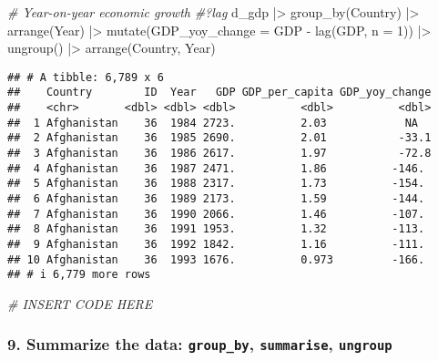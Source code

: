 \documentclass[
]{article}
\newenvironment{Shaded}{\begin{snugshade}}{\end{snugshade}}
\newcommand{\AttributeTok}[1]{\textcolor[rgb]{0.77,0.63,0.00}{#1}}
\newcommand{\CommentTok}[1]{\textcolor[rgb]{0.56,0.35,0.01}{\textit{#1}}}
\newcommand{\DecValTok}[1]{\textcolor[rgb]{0.00,0.00,0.81}{#1}}
\newcommand{\FunctionTok}[1]{\textcolor[rgb]{0.00,0.00,0.00}{#1}}
\newcommand{\NormalTok}[1]{#1}
\newcommand{\SpecialCharTok}[1]{\textcolor[rgb]{0.00,0.00,0.00}{#1}}
\begin{document}
\begin{Shaded}
\begin{Highlighting}[]
\CommentTok{\# Year{-}on{-}year economic growth}
\CommentTok{\#?lag}
\NormalTok{d\_gdp }\SpecialCharTok{|\textgreater{}}
  \FunctionTok{group\_by}\NormalTok{(Country) }\SpecialCharTok{|\textgreater{}}
  \FunctionTok{arrange}\NormalTok{(Year) }\SpecialCharTok{|\textgreater{}}
  \FunctionTok{mutate}\NormalTok{(}\AttributeTok{GDP\_yoy\_change =}\NormalTok{ GDP }\SpecialCharTok{{-}} \FunctionTok{lag}\NormalTok{(GDP, }\AttributeTok{n =} \DecValTok{1}\NormalTok{)) }\SpecialCharTok{|\textgreater{}}
  \FunctionTok{ungroup}\NormalTok{() }\SpecialCharTok{|\textgreater{}}
  \FunctionTok{arrange}\NormalTok{(Country, Year)}
\end{Highlighting}
\end{Shaded}

\begin{verbatim}
## # A tibble: 6,789 x 6
##    Country        ID  Year   GDP GDP_per_capita GDP_yoy_change
##    <chr>       <dbl> <dbl> <dbl>          <dbl>          <dbl>
##  1 Afghanistan    36  1984 2723.          2.03            NA  
##  2 Afghanistan    36  1985 2690.          2.01           -33.1
##  3 Afghanistan    36  1986 2617.          1.97           -72.8
##  4 Afghanistan    36  1987 2471.          1.86          -146. 
##  5 Afghanistan    36  1988 2317.          1.73          -154. 
##  6 Afghanistan    36  1989 2173.          1.59          -144. 
##  7 Afghanistan    36  1990 2066.          1.46          -107. 
##  8 Afghanistan    36  1991 1953.          1.32          -113. 
##  9 Afghanistan    36  1992 1842.          1.16          -111. 
## 10 Afghanistan    36  1993 1676.          0.973         -166. 
## # i 6,779 more rows
\end{verbatim}

\begin{Shaded}
\begin{Highlighting}[]
\CommentTok{\# INSERT CODE HERE}
\end{Highlighting}
\end{Shaded}

\hypertarget{summarize-the-data-group_by-summarise-ungroup}{%
\subsubsection{\texorpdfstring{9. Summarize the data:
\texttt{group\_by}, \texttt{summarise},
\texttt{ungroup}}{9. Summarize the data: group\_by, summarise, ungroup}}\label{summarize-the-data-group_by-summarise-ungroup}}
\end{document}
